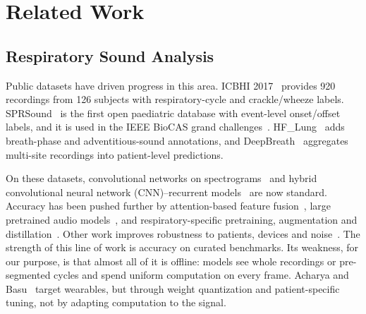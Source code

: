 \section{Related Work}
\label{sec:related}

\subsection{Respiratory Sound Analysis}
Public datasets have driven progress in this area. ICBHI 2017~\cite{rocha2019open} provides 920 recordings from 126 subjects with respiratory-cycle and crackle/wheeze labels. SPRSound~\cite{zhang2022sprsound} is the first open paediatric database with event-level onset/offset labels, and it is used in the IEEE BioCAS grand challenges~\cite{zhang2022grand,zhang2024meta}. HF\_Lung~\cite{hsu2021benchmarking,hsu2022progressively} adds breath-phase and adventitious-sound annotations, and DeepBreath~\cite{heitmann2023deepbreath} aggregates multi-site recordings into patient-level predictions.

On these datasets, convolutional networks on spectrograms~\cite{bardou2018lung,demir2020convolutional,demir2020classification} and hybrid convolutional neural network (CNN)--recurrent models~\cite{acharya2020deep,petmezas2022automated} are now standard. Accuracy has been pushed further by attention-based feature fusion~\cite{crisdayanti2024attention,dong2025respiratory,kim2025enhanced}, large pretrained audio models~\cite{kong2020panns,gong2021ast}, and respiratory-specific pretraining, augmentation and distillation~\cite{bae2023patchmix,niizumi2025towards,toikkanen2025improving,castejonbarrio2026leveraging,hirasawa2026domain}. Other work improves robustness to patients, devices and noise~\cite{kim2025adaptive,jeong2025patient,tzeng2025improving}. The strength of this line of work is accuracy on curated benchmarks. Its weakness, for our purpose, is that almost all of it is offline: models see whole recordings or pre-segmented cycles and spend uniform computation on every frame. Acharya and Basu~\cite{acharya2020deep} target wearables, but through weight quantization and patient-specific tuning, not by adapting computation to the signal.

